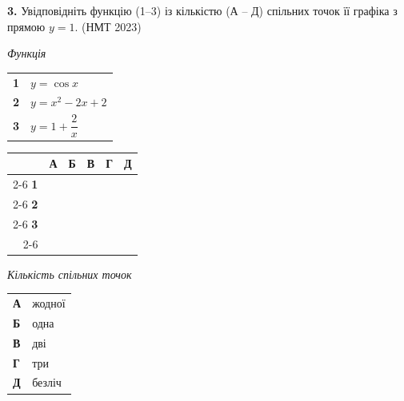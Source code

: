 \documentclass[14pt]{extarticle}
\newcommand{\nmtyear}[1]{\hfill{\small\color{yearcolor}(НМТ #1)}}
\begin{document}
\vspace{0.7cm}

\noindent\textbf{3.} Увідповідніть функцію (1–3) із кількістю (А – Д) спільних точок її графіка з прямою $y=1$. \nmtyear{2023}

\vspace{0.3cm}

\noindent
\begin{minipage}[t]{0.45\textwidth}
    \textit{Функція} \par \vspace{0.2cm}
    \begin{tabular}{@{}p{0.5cm} p{5cm}@{}}
    \textbf{1} & $y=\cos x$ \\[0.3cm]
    \textbf{2} & $y=x^2-2x+2$ \\[0.3cm]
    \textbf{3} & $y=1+\dfrac{2}{x}$ \\
    \end{tabular}
    
    \vspace{0.5cm}
    
    \begingroup
    \setlength{\tabcolsep}{4pt}
    \renewcommand{\arraystretch}{1.2}
    \small
    \begin{tabular}{r|c|c|c|c|c|}
         \multicolumn{1}{c}{} & \multicolumn{1}{c}{\textbf{А}} & \multicolumn{1}{c}{\textbf{Б}} & \multicolumn{1}{c}{\textbf{В}} & \multicolumn{1}{c}{\textbf{Г}} & \multicolumn{1}{c}{\textbf{Д}} \\ \cline{2-6}
         \textbf{1} & & & & & \\ \cline{2-6}
         \textbf{2} & & & & & \\ \cline{2-6}
         \textbf{3} & & & & & \\ \cline{2-6}
    \end{tabular}
    \endgroup
\end{minipage}%
\hfill
\begin{minipage}[t]{0.50\textwidth}
    \textit{Кількість спільних точок} \par \vspace{0.2cm}
    \begin{tabular}{@{}p{0.5cm} p{7.5cm}@{}}
    \textbf{А} & жодної \\[0.3cm]
    \textbf{Б} & одна \\[0.3cm]
    \textbf{В} & дві \\[0.3cm]
    \textbf{Г} & три \\[0.3cm]
    \textbf{Д} & безліч \\
    \end{tabular}
\end{minipage}
\end{document}
